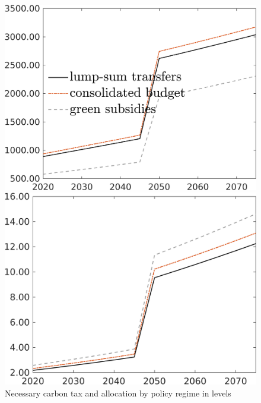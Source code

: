 \begin{figure}[h!!]
	\caption{Necessary carbon tax and allocation by policy regime in levels}\label{fig:regs}
	\begin{minipage}[]{0.32\textwidth}
		\includegraphics[width=1\textwidth]{../../codding_model/own_basedOnFried/optimalPol_010922_revision/figures/all_13Sept22/CompRed_TaulCalib_Tauf_spillover0_knspil0_nsk0_xgr0_sep0_LFlimit1_emsbase0_countec0_GovRev0_etaa0.79_lgd1.png}
	\end{minipage}
\begin{minipage}[]{0.32\textwidth}
\includegraphics[width=1\textwidth]{../../codding_model/own_basedOnFried/optimalPol_010922_revision/figures/all_13Sept22/CompRed_TaulCalib_GFF_spillover0_knspil0_nsk0_xgr0_sep0_LFlimit1_emsbase0_countec0_GovRev0_etaa0.79_lgd0.png}

\end{minipage}
\end{figure}
